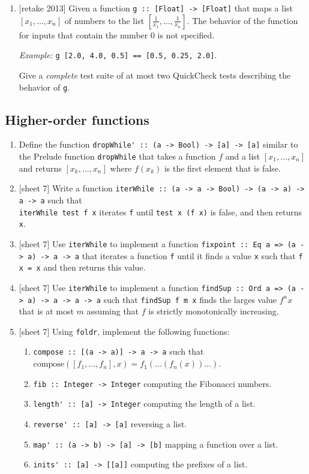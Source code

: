 \documentclass{article}
\def\code#1{\texttt{#1}}
\begin{document}
\begin{enumerate}
\item {[retake 2013]} Given a function \code{g :: [Float] -> [Float]} that maps a list $[x_1, \dots, x_n]$ of numbers to the list $[\frac{1}{x_1}, \dots, \frac{1}{x_n}]$. The behavior of the function for inputs that contain the number $0$ is not specified. \par
\textit{Example:} \code{g [2.0, 4.0, 0.5] == [0.5, 0.25, 2.0]}. \par
Give a \textit{complete} test suite of at most two QuickCheck tests describing the behavior of \code{g}.
\end{enumerate}

\subsection{Higher-order functions}
\begin{enumerate}
\item Define the function \verb|dropWhile' :: (a -> Bool) -> [a] -> [a]| similar to the Prelude function \verb|dropWhile| that takes a function $f$ and a list $[x_1, \dots, x_n]$ and returns $[x_k, \dots, x_n]$ where $f(x_k)$ is the first element that is false.

\item {[sheet 7]} Write a function \verb|iterWhile :: (a -> a -> Bool) -> (a -> a) -> a -> a| such that \\ \verb|iterWhile test f x| iterates \verb|f| until \verb|test x (f x)| is false, and then returns \verb|x|.

\item {[sheet 7]} Use \verb|iterWhile| to implement a function \verb|fixpoint :: Eq a => (a -> a) -> a -> a| that iterates a function \verb|f| until it finds a value \verb|x| such that \verb|f x = x| and then returns this value.

\item {[sheet 7]} Use \verb|iterWhile| to implement a function \verb|findSup :: Ord a => (a -> a) -> a -> a -> a| such that \verb|findSup f m x| finds the larges value $f^nx$ that is at most $m$ assuming that $f$ is strictly monotonically increasing.

\item {[sheet 7]} Using \verb|foldr|, implement the following functions:
\begin{enumerate}
\item \verb|compose :: [(a -> a)] -> a -> a| such that $\text{compose}([f_1, \dots, f_n], x) = f_1(\dots(f_n(x))\dots)$.
\item \verb|fib :: Integer -> Integer| computing the Fibonacci numbers.
\item \verb|length' :: [a] -> Integer| computing the length of a list.
\item \verb|reverse' :: [a] -> [a]| reversing a list.
\item \verb|map' :: (a -> b) -> [a] -> [b]| mapping a function over a list.
\item \verb|inits' :: [a] -> [[a]]| computing the prefixes of a list.
\end{enumerate}


\end{enumerate}
\end{document}
